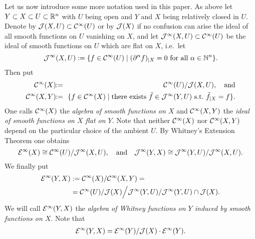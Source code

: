 Let us now introduce some more notation used in this paper. As above let 
$Y\subset X \subset U \subset \mathbb{R}^n$ with $U$ being open and $Y$ and $X$ being
relatively closed in $U$. Denote by $\mathcal{J} (X,U) \subset \mathcal{C}^\infty (U)$
or by $\mathcal{J} (X)$ if no confusion can arise
the ideal of all smooth functions on $U$ vanishing on $X$, and
let $\mathcal{J}^\infty (X,U) \subset \mathcal{C}^\infty (U)$ be the ideal of 
smooth functions on $U$ which are flat on $X$, i.e.~let 
\[
  \mathcal{J}^\infty (X,U) := \{ f \in \mathcal{C}^\infty (U) \mid (\partial^\alpha f)_{|X} = 0 
  \text{ for all $\alpha \in \mathbb{N}^n$}\}.
\] Then put 
\begin{eqnarray}
\label{Eq:DefSmFct}
  \calC^\infty (X)  & \!\! := \!\! & \calC^\infty (U) / \calJ (X,U) , 
  \quad \text{and} \\
\label{Eq:DefSmFctRel}
  \calC^\infty (X,Y)  &  \!\! := \!\! &
  \{f \in \calC^\infty (X)\mid \text{there exists $\tilde f \in 
  \calJ^\infty (Y,U)$ s.t.~$\tilde f_{|X} = f$} \}. %
\end{eqnarray}
One calls $\mathcal{C}^\infty (X)$ the \textit{algebra of smooth functions on $X$}
and $\mathcal{C}^\infty (X,Y)$ the \textit{ideal of smooth functions on $X$ 
flat on $Y$}. Note that neither $\mathcal{C}^\infty (X)$ nor $\mathcal{C}^\infty (X,Y)$ 
depend on the particular choice of the ambient $U$.
By Whitney's Extension Theorem one obtains 
\begin{equation}
  \label{Eq:WET}
  \mathcal{E}^\infty (X) \cong \mathcal{C}^\infty (U) / \mathcal{J}^\infty (X,U), \quad 
  \text{and} \quad
  \mathcal{J}^\infty (Y,X) \cong \mathcal{J}^\infty (Y,U) / \mathcal{J}^\infty (X,U) .
\end{equation}
We finally put
\begin{equation}
  \label{Eq:ISF}
  \begin{split}
  \mathcal{E}^\infty (Y, X) & := \mathcal{C}^\infty (X) / \mathcal{C}^\infty (X,Y) = \\
  & = \mathcal{C}^\infty (U) / \mathcal{J} (X)  \Big/ \mathcal{J}^\infty (Y,U) / 
  \mathcal{J}^\infty (Y,U) \cap \mathcal{J} (X). 
\end{split}
\end{equation}
We will call $\mathcal{E}^\infty (Y, X)$ the \textit{algebra of Whitney functions 
on $Y$ induced by smooth functions on $X$}. Note that
\begin{equation}
\label{Eq:QR}
\begin{split}
  \mathcal{E}^\infty (Y,X) =  \mathcal{E}^\infty (Y ) / 
  \mathcal{J} (X)\cdot \mathcal{E}^\infty (Y) . 
\end{split}
\end{equation}

